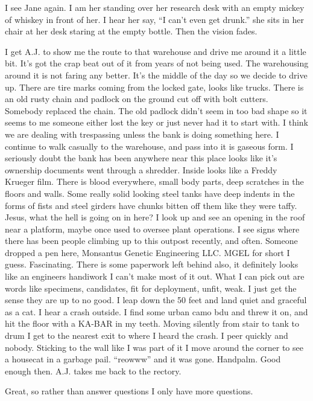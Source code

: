 I see Jane again. I am her standing over her research desk with an empty mickey of whiskey in front of her. I hear her say, ``I can't even get drunk.'' she sits in her chair at her desk staring at the empty bottle. Then the vision fades.

I get A.J. to show me the route to that warehouse and drive me around it a little bit. It's got the crap beat out of it from years of not being used. The warehousing around it is not faring any better. It's the middle of the day so we decide to drive up. There are tire marks coming from the locked gate, looks like trucks. 
There is an old rusty chain and padlock on the ground cut off with bolt cutters. Somebody replaced the chain. The old padlock didn't seem in too bad shape so it seems to me someone either lost the key or just never had it to start with. I think we are dealing with trespassing unless the bank is doing something here. I continue to walk casually to the warehouse, and pass into it is gaseous form. I seriously doubt the bank has been anywhere near this place looks like it's ownership documents went through a shredder. Inside looks like a Freddy Krueger film. There is blood everywhere, small body parts, deep scratches in the floors and walls. Some really solid looking steel tanks have deep indents in the forms of fists and steel girders have chunks bitten off them like they were taffy. Jesus, what the hell is going on in here? I look up and see an opening in the roof near a platform, maybe once used to oversee plant operations. I see signs where there has been people climbing up to this outpost recently, and often. Someone dropped a pen here, Monsantus Genetic Engineering LLC. MGEL for short I guess. Fascinating. There is some paperwork left behind also, it definitely looks like an engineers handiwork I can't make most of it out. What I can pick out are words like specimens, candidates, fit for deployment, unfit, weak. I just get the sense they are up to no good. I leap down the 50 feet and land quiet and graceful as a cat. I hear a crash outside. I find some urban camo bdu and threw it on, and hit the floor with a KA-BAR in my teeth. Moving silently from stair to tank to drum I get to the nearest exit to where I heard the crash. I peer quickly and nobody. Sticking to the wall like I was part of it I move around the corner to see a housecat in a garbage pail. ``reowww'' and it was gone. Handpalm. Good enough then. A.J. takes me back to the rectory.

Great, so rather than answer questions I only have more questions. 

